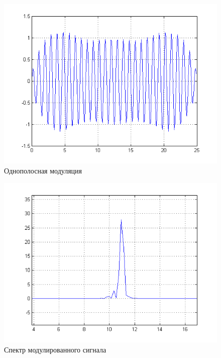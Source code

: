 \documentclass[a4paper, 12pt]{article}
\begin{document}
\begin{figure}[H]
   \includegraphics[scale=0.7]{lab7/ssbmod.png}
   \caption{Однополосная модуляция}
\end{figure}

\begin{figure}[H]
   \includegraphics[scale=0.7]{lab7/ssbmod_spectro.png}
   \caption{Спектр модулированного сигнала}
\end{figure}
\end{document}
